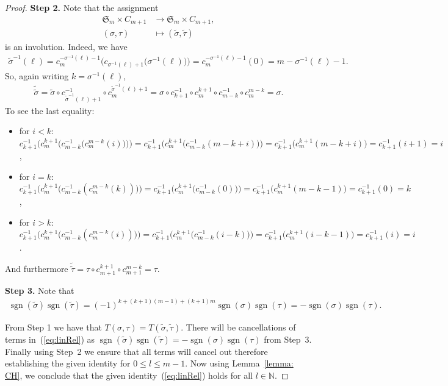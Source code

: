 \documentclass[pdftex]{sigma}
\numberwithin{equation}{section}
\DeclareMathOperator{\sgn}{sgn}
\begin{document}
\begin{proof}
    {\bf Step 2.}
	Note that the assignment
	\begin{align*}
	\mathfrak{S}_m \times C_{m+1} & \to \mathfrak{S}_m \times C_{m+1}, \\
	(\sigma,\tau) & \mapsto (\tilde{\sigma}, \tilde{\tau})
	\end{align*}
	is an involution. Indeed,
	we have
	\begin{gather*}
		\tilde{\sigma}^{-1}(\ell) = c_m^{-\sigma^{-1}(\ell)-1}\big(c_{\sigma^{-1}(\ell)+1}\big(\sigma^{-1}(\ell)\big)\big)
		= c_m^{-\sigma^{-1}(\ell)-1}(0)
		= m-\sigma^{-1}(\ell)-1.
	\end{gather*}
	So, again writing $k=\sigma^{-1}(\ell)$,
	\begin{gather*}
	\tilde{\tilde{\sigma}} = \tilde{\sigma} \circ c_{\tilde{\sigma}^{-1}(\ell)+1}^{-1} \circ c_{m}^{\tilde{\sigma}^{-1}(\ell)+1}
	=\sigma \circ c_{k+1}^{-1} \circ c_{m}^{k+1} \circ c_{m-k}^{-1} \circ c_{m}^{m-k}
	= \sigma.
	\end{gather*}
	To see the last equality:
	\begin{itemize}\itemsep=0pt
		\item for $i<k$: $c_{k+1}^{-1}\big(c_{m}^{k+1}\big(c_{m-k}^{-1}\big(c_{m}^{m-k}(i)\big)\big)\big) = c_{k+1}^{-1}\big(c_{m}^{k+1}\big(c_{m-k}^{-1}(m-k+i)\big)\big) =  c_{k+1}^{-1}\big(c_{m}^{k+1}(m-k+i)\big)=c_{k+1}^{-1}(i+1)=i$,
		\item for $i=k$: $c_{k+1}^{-1}\big(c_{m}^{k+1}\big(c_{m-k}^{-1}(c_{m}^{m-k}(k))\big)\big) = c_{k+1}^{-1}\big(c_{m}^{k+1}\big(c_{m-k}^{-1}(0)\big)\big) = c_{k+1}^{-1}\big(c_{m}^{k+1}(m-k-1)\big)=c_{k+1}^{-1}(0)=k$,
		\item for $i>k$: $c_{k+1}^{-1}\big(c_{m}^{k+1}\big(c_{m-k}^{-1}(c_{m}^{m-k}(i))\big)\big) = c_{k+1}^{-1}\big(c_{m}^{k+1}\big(c_{m-k}^{-1}(i-k)\big)\big) =  c_{k+1}^{-1}\big(c_{m}^{k+1}(i-k-1)\big)=c_{k+1}^{-1}(i)=i$.
	\end{itemize}
	And furthermore $\tilde{\tilde{\tau}} = \tau \circ c_{m+1}^{k+1} \circ c_{m+1}^{m-k} = \tau$.
	
	{\bf Step 3.} Note that
	\begin{gather*}
	\sgn(\tilde{\sigma})\sgn(\tilde{\tau})  = (-1)^{k+(k+1)(m-1)+(k+1)m}\sgn(\sigma)\sgn(\tau)
	 =-\sgn(\sigma)\sgn(\tau).
	\end{gather*}
	
	From Step 1 we have that $T(\sigma,\tau) = T(\tilde{\sigma},\tilde{\tau})$. There will be cancellations of terms in~(\ref{eq:linRel}) as  $\sgn(\tilde{\sigma})\sgn(\tilde{\tau}) = -\sgn(\sigma)\sgn(\tau)$ from Step~3. Finally using Step~2 we ensure that all terms will cancel out therefore establishing the given identity for $ 0 \leq l \leq m-1$. Now using Lemma~\ref{lemma: CH}, we conclude that the given identity~(\ref{eq:linRel}) holds for all $l \in \mathbb{N}$.
\end{proof}
\end{document}
